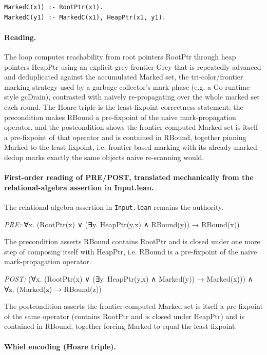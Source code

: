 \documentclass[10pt]{article}
\begin{document}
\begin{Verbatim}[fontsize=\scriptsize,breaklines=true,breakanywhere=true,frame=single,framesep=1.5mm]
MarkedC(x1) :- RootPtr(x1).
MarkedC(y1) :- MarkedC(x1), HeapPtr(x1, y1).
\end{Verbatim}

\paragraph{Reading.} The loop computes reachability from root pointers RootPtr through heap pointers HeapPtr using an explicit grey frontier Grey that is repeatedly advanced and deduplicated against the accumulated Marked set, the tri-color/frontier marking strategy used by a garbage collector's mark phase (e.g. a Go-runtime-style gcDrain), contrasted with naively re-propagating over the whole marked set each round. The Hoare triple is the least-fixpoint correctness statement: the precondition makes RBound a pre-fixpoint of the naive mark-propagation operator, and the postcondition shows the frontier-computed Marked set is itself a pre-fixpoint of that operator and is contained in RBound, together pinning Marked to the least fixpoint, i.e. frontier-based marking with its already-marked dedup marks exactly the same objects naive re-scanning would.

\paragraph{First-order reading of PRE/POST, translated mechanically from the relational-algebra assertion in Input.lean.} The relational-algebra assertion in \texttt{Input.lean} remains the authority.

\textit{PRE:} ∀x. (RootPtr(x) ∨ (∃y. HeapPtr(y,x) ∧ RBound(y)) → RBound(x))\par The precondition asserts RBound contains RootPtr and is closed under one more step of composing itself with HeapPtr, i.e. RBound is a pre-fixpoint of the naive mark-propagation operator.

\textit{POST:} (∀x. (RootPtr(x) ∨ (∃y. HeapPtr(y,x) ∧ Marked(y)) → Marked(x))) ∧ ∀z. (Marked(z) → RBound(z))\par The postcondition asserts the frontier-computed Marked set is itself a pre-fixpoint of the same operator (contains RootPtr and is closed under HeapPtr) and is contained in RBound, together forcing Marked to equal the least fixpoint.

\paragraph{Whiel encoding (Hoare triple).}
\end{document}
